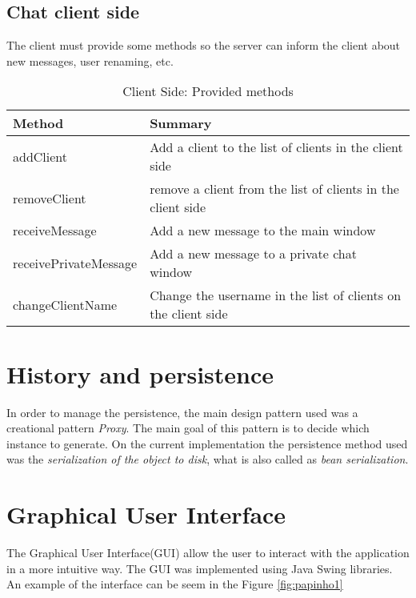 \documentclass[times, 8pt,twocolumn]{article}
\begin{document}
\subsection{Chat client side}

The client must provide some methods so the server can inform the client about new messages, user renaming, etc.  
  \begin{table}[H]
  \begin{center}
      \begin{tabular}{ | l | p{5cm} |}
      \hline
      Method & Summary \\ \hline
      addClient & Add a client to the list of clients in the client side \\ \hline 
      removeClient & remove a client from the list of clients in the client side \\ \hline
      receiveMessage & Add a new message to the main window \\ \hline
      receivePrivateMessage &  Add a new message to a private chat window \\ \hline
      changeClientName & Change the username in the list of clients on the client side \\ \hline
      \end{tabular}
  \end{center}
  \caption{Client Side: Provided methods}
  \label{tab:clientprovide}
  \end{table}

\section{History and persistence}

In order to manage the persistence, the main design pattern used was a creational pattern {\it Proxy}. The main goal of this pattern is to decide which instance to generate.
On the current implementation the persistence method used was the {\it serialization of the object to disk}, what is also called as {\it bean serialization}. 

\section{Graphical User Interface}

The Graphical User Interface(GUI) allow the user to interact with the application in a more intuitive way. 
The GUI was implemented using Java Swing libraries. An example of the interface can be seem in the Figure \ref{fig:papinho1}
\end{document}
